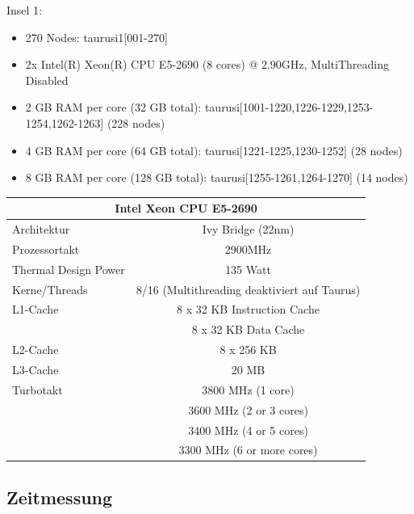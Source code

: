 \documentclass[12pt,a4paper]{article}
\begin{document}
Insel 1\cite{tudhardwaretaurus}:
\begin{itemize}
	\item 270 Nodes: taurusi1[001-270]
	\item 2x Intel(R) Xeon(R) CPU E5-2690 (8 cores) @ 2.90GHz, MultiThreading Disabled
	\item 2 GB RAM per core (32 GB total): taurusi[1001-1220,1226-1229,1253-1254,1262-1263] (228 nodes)
	\item 4 GB RAM per core (64 GB total): taurusi[1221-1225,1230-1252] (28 nodes)
	\item 8 GB RAM per core (128 GB total): taurusi[1255-1261,1264-1270]  (14 nodes)
\end{itemize}

\begin{center}
\captionsetup{type=table}
\begin{tabular}{|l|c|}
	\hline
		\multicolumn{2}{|c|}{\textbf{Intel Xeon CPU E5-2690}} \\
	\hline
	\hline
	Architektur & Ivy Bridge (22nm) \\
	\hline
	Prozessortakt & 2900MHz \\
	\hline
	Thermal Design Power & 135 Watt \\
	\hline
	Kerne/Threads & 8/16 (Multithreading deaktiviert auf Taurus) \\
	\hline
	L1-Cache & 8 x 32 KB Instruction Cache \\
	         & 8 x 32 KB Data Cache \\
	\hline
	L2-Cache & 8 x 256 KB \\
	\hline
	L3-Cache & 20 MB \\
	\hline
	Turbotakt & 3800 MHz (1 core)\\
              & 3600 MHz (2 or 3 cores)\\
              & 3400 MHz (4 or 5 cores)\\
              & 3300 MHz (6 or more cores) \\
	\hline
\end{tabular}
\end{center}



\subsection{Zeitmessung}
\end{document}
